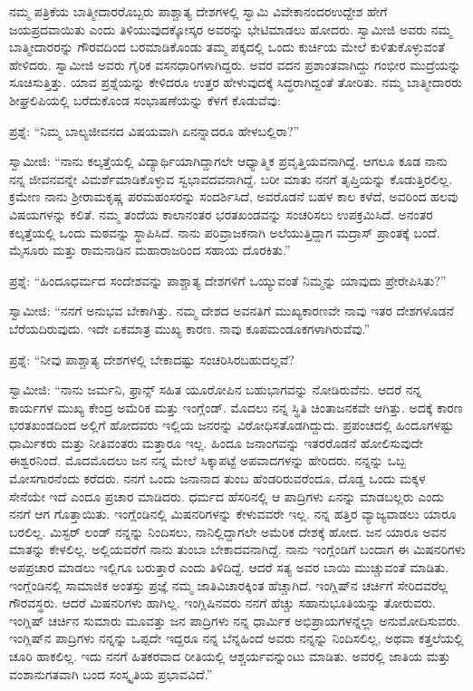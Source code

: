 ನಮ್ಮ ಪತ್ರಿಕೆಯ ಬಾತ್ಮೀದಾರರೊಬ್ಬರು ಪಾಶ್ಚಾತ್ಯ ದೇಶಗಳಲ್ಲಿ ಸ್ವಾಮಿ ವಿವೇಕಾನಂದರ\break ಉದ್ದೇಶ ಹೇಗೆ ಜಯಪ್ರದವಾಯಿತು ಎಂದು ತಿಳಿಯುವುದಕ್ಕೋಸ್ಕರ ಅವರನ್ನು ಭೇಟಿಮಾಡಲು ಹೋದರು. ಸ್ವಾಮೀಜಿ ಅವರು ನಮ್ಮ ಬಾತ್ಮೀದಾರರನ್ನು ಗೌರವದಿಂದ ಬರಮಾಡಿಕೊಂಡು ತಮ್ಮ ಪಕ್ಕದಲ್ಲಿ ಒಂದು ಕುರ್ಚಿಯ ಮೇಲೆ ಕುಳಿತುಕೊಳ್ಳುವಂತೆ ಹೇಳಿದರು. ಸ್ವಾಮೀಜಿ ಅವರು ಗೈರಿಕ ವಸನಧಾರಿಗಳಾಗಿದ್ದರು. ಅವರ ವದನ ಪ್ರಶಾಂತವಾಗಿದ್ದು ಗಂಭೀರ ಮುದ್ರೆಯನ್ನು ಸೂಚಿಸುತ್ತಿತ್ತು. ಯಾವ ಪ್ರಶ್ನೆಯನ್ನು ಕೇಳಿದರೂ ಉತ್ತರ ಹೇಳುವುದಕ್ಕೆ ಸಿದ್ಧರಾಗಿದ್ದಂತೆ ತೋರಿತು. ನಮ್ಮ ಬಾತ್ಮೀದಾರರು ಶೀಘ್ರಲಿಪಿಯಲ್ಲಿ ಬರೆದುಕೊಂಡ ಸಂಭಾಷಣೆಯನ್ನು ಕೆಳಗೆ ಕೊಡುವೆವು:

ಪ್ರಶ್ನೆ: “ನಿಮ್ಮ ಬಾಲ್ಯಜೀವನದ ವಿಷಯವಾಗಿ ಏನನ್ನಾದರೂ ಹೇಳಬಲ್ಲಿರಾ?”

ಸ್ವಾಮೀಜಿ: “ನಾನು ಕಲ್ಕತ್ತೆಯಲ್ಲಿ ವಿದ್ಯಾರ್ಥಿಯಾಗಿದ್ದಾಗಲೇ ಆಧ್ಯಾತ್ಮಿಕ ಪ್ರವೃತ್ತಿಯವ\-ನಾಗಿದ್ದೆ. ಆಗಲೂ ಕೂಡ ನಾನು ನನ್ನ ಜೀವನವನ್ನೇ ವಿಮರ್ಶೆಮಾಡಿಕೊಳ್ಳುವ ಸ್ವಭಾವದವ\-ನಾಗಿದ್ದೆ. ಬರೀ ಮಾತು ನನಗೆ ತೃಪ್ತಿಯನ್ನು ಕೊಡುತ್ತಿರಲಿಲ್ಲ. ಕ್ರಮೇಣ ನಾನು ಶ‍್ರೀರಾಮ\-ಕೃಷ್ಣ ಪರಮಹಂಸರನ್ನು ಸಂದರ್ಶಿಸಿದೆ, ಅವರೊಡನೆ ಬಹಳ ಕಾಲ ಕಳೆದೆ, ಅವರಿಂದ ಹಲವು ವಿಷಯಗಳನ್ನು ಕಲಿತೆ. ನಮ್ಮ ತಂದೆಯ ಕಾಲಾನಂತರ ಭರತಖಂಡವನ್ನು ಸಂಚರಿಸಲು ಉಪಕ್ರಮಿಸಿದೆ. ಅನಂತರ ಕಲ್ಕತ್ತೆಯಲ್ಲಿ ಒಂದು ಮಠವನ್ನು ಸ್ಥಾಪಿಸಿದೆ. ನಾನು ಪರಿವ್ರಾಜಕನಾಗಿ ಅಲೆಯುತ್ತಿದ್ದಾಗ ಮದ್ರಾಸ್​ ಪ್ರಾಂತಕ್ಕೆ ಬಂದೆ. ಮೈಸೂರು ಮತ್ತು ರಾಮನಾಡಿನ ಮಹಾರಾಜರಿಂದ ಸಹಾಯ ದೊರಕಿತು.”

\vskip 0.1cm

ಪ್ರಶ್ನೆ: “ಹಿಂದೂಧರ್ಮದ ಸಂದೇಶವನ್ನು ಪಾಶ್ಚಾತ್ಯ ದೇಶಗಳಿಗೆ ಒಯ್ಯುವಂತೆ ನಿಮ್ಮನ್ನು ಯಾವುದು ಪ್ರೇರೇಪಿಸಿತು?”

\vskip 0.1cm

ಸ್ವಾಮೀಜಿ: “ನನಗೆ ಅನುಭವ ಬೇಕಾಗಿತ್ತು. ನಮ್ಮ ದೇಶದ ಅವನತಿಗೆ ಮುಖ್ಯ\break ಕಾರಣವೇ ನಾವು ಇತರ ದೇಶಗಳೊಡನೆ ಬೆರೆಯದಿರುವುದು. ಇದೇ ಏಕಮಾತ್ರ ಮುಖ್ಯ ಕಾರಣ. ನಾವು ಕೂಪಮಂಡೂಕಗಳಾಗಿರುವೆವು.”

\vskip 0.1cm

ಪ್ರಶ್ನೆ: “ನೀವು ಪಾಶ್ಚಾತ್ಯ ದೇಶಗಳಲ್ಲಿ ಬೇಕಾದಷ್ಟು ಸಂಚರಿಸಿರಬಹುದಲ್ಲವೆ?

\vskip 0.1cm

ಸ್ವಾಮೀಜಿ: “ನಾನು ಜರ್ಮನಿ, ಫ್ರಾನ್ಸ್​ ಸಹಿತ ಯೂರೋಪಿನ ಬಹುಭಾಗವನ್ನು ನೋಡಿರುವೆನು. ಆದರೆ ನನ್ನ ಕಾರ್ಯಗಳ ಮುಖ್ಯ ಕೇಂದ್ರ ಅಮೆರಿಕ ಮತ್ತು ಇಂಗ್ಲೆಂಡ್​. ಮೊದಲು ನನ್ನ ಸ್ಥಿತಿ ಚಿಂತಾಜನಕವೇ ಆಗಿತ್ತು. ಅದಕ್ಕೆ ಕಾರಣ ಭರತಖಂಡದಿಂದ ಅಲ್ಲಿಗೆ ಹೋದವರು ಇಲ್ಲಿಯ ಜನರನ್ನು ವಿರೋಧಿಸತೊಡಗಿದ್ದುದು. ಪ್ರಪಂಚದಲ್ಲಿ ಹಿಂದೂಗಳಷ್ಟು ಧಾರ್ಮಿಕರು ಮತ್ತು ನೀತಿವಂತರು ಮತ್ತಾರೂ ಇಲ್ಲ. ಹಿಂದೂ ಜನಾಂಗವನ್ನು ಇತರರೊಡನೆ ಹೋಲಿಸುವುದೇ ಈಶ್ವರನಿಂದೆ. ಮೊದಮೊದಲು ಜನ ನನ್ನ ಮೇಲೆ ಸಿಕ್ಕಾಪಟ್ಟೆ ಅಪವಾದಗಳನ್ನು ಹೇರಿದರು. ನನ್ನನ್ನು ಒಬ್ಬ ಮೋಸಗಾರನೆಂದು ಕರೆದರು. ನನಗೆ ಒಂದು ಜನಾನಾದ ತುಂಬ ಹೆಂಡರಿರುವರೆಂದೂ, ದೊಡ್ಡ ಒಂದು ಮಕ್ಕಳ ಸೇನೆಯೇ ಇದೆ ಎಂದೂ ಪ್ರಚಾರ ಮಾಡಿದರು. ಧರ್ಮದ ಹೆಸರಿನಲ್ಲಿ ಆ ಪಾದ್ರಿಗಳು ಏನನ್ನು ಮಾಡಬಲ್ಲರು ಎಂದು ನನಗೆ ಆಗ ಗೊತ್ತಾಯಿತು. ಇಂಗ್ಲೆಂಡಿನಲ್ಲಿ ಮಿಷನರಿಗಳನ್ನು ಕೇಳುವವರೇ ಇಲ್ಲ. ನನ್ನ ಹತ್ತಿರ ವ್ಯಾಜ್ಯವಾಡಲು ಯಾರೂ ಬರಲಿಲ್ಲ. ಮಿಸ್ಟರ್​ ಲಂಡ್​ ನನ್ನನ್ನು ನಿಂದಿಸಲು, ನಾನಿಲ್ಲಿದ್ದಾಗಲೇ ಅಮೆರಿಕ ದೇಶಕ್ಕೆ ಹೋದ. ಜನ ಯಾರೂ ಅವನ ಮಾತನ್ನು ಕೇಳಲಿಲ್ಲ. ಅಲ್ಲಿಯವರೆಗೆ ನಾನು ತುಂಬಾ ಬೇಕಾದವನಾಗಿದ್ದೆ. ನಾನು ಇಂಗ್ಲೆಂಡಿಗೆ ಬಂದಾಗ ಈ ಮಿಷನರಿಗಳು ಅಪಪ್ರಚಾರ ಮಾಡಲು ಇಲ್ಲಿಗೂ ಬರುತ್ತಾರೆ ಎಂದು ತಿಳಿದಿದ್ದೆ. ಆದರೆ ಸತ್ಯ ಅವರ ಬಾಯಿ ಮುಚ್ಚುವಂತೆ ಮಾಡಿತು. ಇಂಗ್ಲೆಂಡಿನಲ್ಲಿ ಸಾಮಾಜಿಕ ಅಂತಸ್ತು ಪ್ರಜ್ಞೆ ನಮ್ಮ ಜಾತಿವಿಚಾರಕ್ಕಿಂತ ಹೆಚ್ಚಾಗಿದೆ. ಇಂಗ್ಲಿಷ್​ನ ಚರ್ಚಿಗೆ ಸೇರಿದವರೆಲ್ಲ ಗೌರವಸ್ಥರು. ಆದರೆ ಮಿಷನರಿಗಳು ಹಾಗಿಲ್ಲ. ಇಂಗ್ಲಿಷಿನವರು ನನಗೆ ಹೆಚ್ಚು ಸಹಾನುಭೂತಿಯನ್ನು ತೋರುವರು. ಇಂಗ್ಲಿಷ್​ ಚರ್ಚಿನ ಸುಮಾರು ಮೂವತ್ತು ಜನ ಪಾದ್ರಿಗಳು ನನ್ನ ಧಾರ್ಮಿಕ ಅಭಿಪ್ರಾಯಗಳನ್ನೆಲ್ಲಾ ಅನುಮೋದಿಸುವರು. ಇಂಗ್ಲಿಷ್​ನ ಪಾದ್ರಿಗಳು ನನ್ನನ್ನು ಒಪ್ಪದೇ ಇದ್ದರೂ ನನ್ನ ಬೆನ್ನ\break ಹಿಂದೆ ಅವರು ನನ್ನನ್ನು ನಿಂದಿಸಲಿಲ್ಲ, ಅಥವಾ ಕತ್ತಲೆಯಲ್ಲಿ ಚೂರಿ ಹಾಕಲಿಲ್ಲ. ಇದು ನನಗೆ ಹಿತಕರವಾದ ರೀತಿಯಲ್ಲಿ ಆಶ್ಚರ್ಯವನ್ನುಂಟು ಮಾಡಿತು. ಅವರಲ್ಲಿ ಜಾತಿಯ ಮತ್ತು ವಂಶಾನುಗತವಾಗಿ ಬಂದ ಸಂಸ್ಕೃತಿಯ ಪ್ರಭಾವವಿದೆ.”

